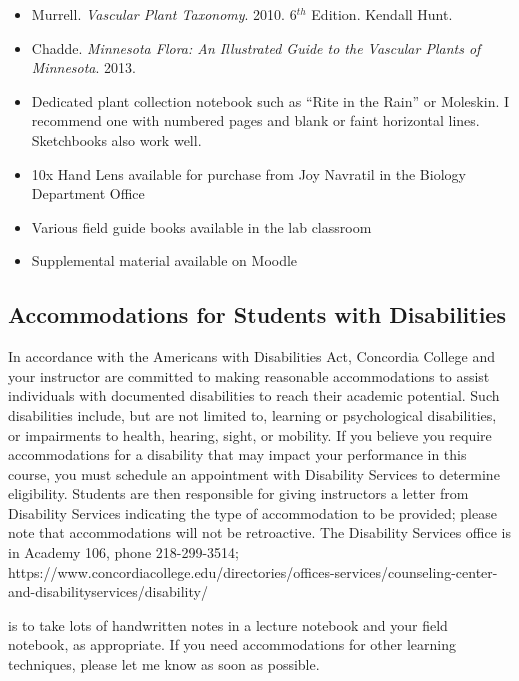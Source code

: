 \documentclass{tufte-handout}
\begin{document}
\begin{fullwidth}
\begin{itemize}
	\item Murrell. \emph{Vascular Plant Taxonomy}. 2010. 6$^{th}$ Edition. Kendall Hunt.
	\item Chadde. \emph{Minnesota Flora: An Illustrated Guide to the Vascular Plants of Minnesota}. 2013. 
	\item Dedicated plant collection notebook such as ``Rite in the Rain'' or Moleskin. I recommend one with numbered pages and blank or faint horizontal lines. Sketchbooks also work well.
	\item 10x Hand Lens available for purchase from Joy Navratil in the Biology Department Office
	\item Various field guide books available in the lab classroom
	\item Supplemental material available on Moodle
\end{itemize}


\subsection{Accommodations for Students with Disabilities}

In accordance with the Americans with Disabilities Act, Concordia College and your instructor are committed to making reasonable accommodations to assist individuals with documented disabilities to reach their academic potential. Such disabilities include, but are not limited to, learning or psychological disabilities, or impairments to health, hearing, sight, or mobility. If you believe you require accommodations for a disability that may impact your performance in this course, you must schedule an appointment with Disability Services to determine eligibility. Students are then responsible for giving instructors a letter from Disability Services indicating the type of accommodation to be provided; please note that accommodations will not be retroactive. The Disability Services office is in Academy 106, phone 218-299-3514; https://www.concordiacollege.edu/directories/offices-services/counseling-center-and-disabilityservices/disability/ 

 is to take lots of handwritten notes in a lecture notebook and your field notebook, as appropriate. If you need accommodations for other learning techniques, please let me know as soon as possible. 


\end{fullwidth}
\end{document}
